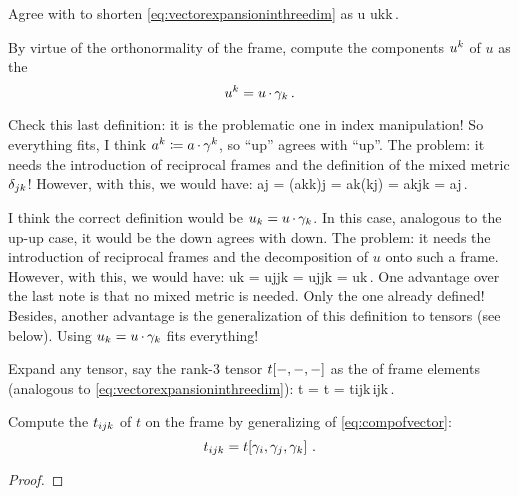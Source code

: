 Agree with  to shorten \cref{eq:vectorexpansioninthreedim} as
\beq
u  \cnvec uk\nbvec k\,.
\eeq

By virtue of the orthonormality of the frame, compute the components ${u}^{k}$ of $u$ as the 
\begin{equation}\label{eq:compofvector}
{u}^{k} = u\operatorname{\cdot}\gamma_{k}\,.
\end{equation}

\begin{note}
Check this last definition: it is the problematic one in index manipulation! So everything fits, I think ${a}^{k}\coloneqq a\operatorname{\cdot}\gamma^{k}$, so ``up'' agrees with ``up''. The problem: it needs the introduction of reciprocal frames and the definition of the mixed metric $\delta_{{j}{k}}$! However, with this, we would have: 
\beq
\cnvec aj = (\cnvec ak\nbvec k)\iprod\nbvec j 
         = \cnvec ak(\nbvec k\iprod\nbvec j)
         = \cnvec ak\mkron jk
         = \cnvec aj\,.\mqed
\eeq
\end{note}

\begin{note}
I think the correct definition would be ${u}_{k} = u\operatorname{\cdot}\gamma_{k}$. In this case, analogous to the up-up case, it would be the down agrees with down. The problem: it needs the introduction of reciprocal frames and the decomposition of $u$ onto such a frame. However, with this, we would have:
\beq
\covec uk = \cnvec uj\nbvec j\iprod\nbvec k
          = \cnvec uj\ikron jk
          = \covec uk\,.
\eeq
One advantage over the last note is that no mixed metric is needed. Only the one already defined! Besides, another advantage is the generalization of this definition to tensors (see below). Using ${u}_{k} = u\operatorname{\cdot}\gamma_{k}$ fits everything!
\end{note}

Expand any tensor, say the rank-3 tensor $t\!\left[{-,-,-}\right]$ as the  of frame elements (analogous to \cref{eq:vectorexpansioninthreedim}):
\beq
t = t 
  = \cntens t{ijk}\,\nbvec i\tprod\nbvec j\tprod\nbvec k\,.
\eeq

Compute the  ${t}_{ijk}$ of $t$ on the frame by generalizing of \cref{eq:compofvector}:
\begin{equation}\label{eq:comptensoronframe}
{t}_{ijk} = t\!\left[{\gamma_{i}, \gamma_{j}, \gamma_{k}}\right]\,.
\end{equation}
\begin{proof}
\end{proof}

